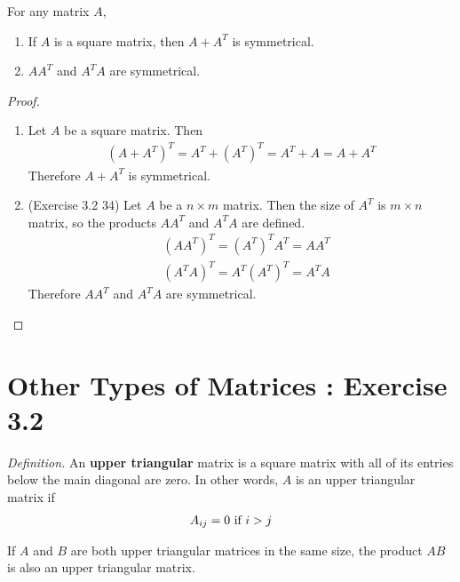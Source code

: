 \begin{theorem}
	For any matrix $A$,
	\begin{enumerate}
		\item If $A$ is a square matrix, then $A + A^{T}$ is symmetrical.
		\item $AA^{T}$ and $A^{T}A$ are symmetrical.
	\end{enumerate}
\end{theorem}

\begin{proof}
	\noindent
	\begin{enumerate}
		\item Let $A$ be a square matrix. Then
		\begin{align*}
		(A+A^T)^T = A^T + (A^T)^T = A^T + A = A+A^T
		\end{align*}
		Therefore $A+A^T$ is symmetrical.
		\item (Exercise 3.2 34) Let $A$ be a $n \times m$ matrix. Then the size of $A^T$ is $m \times n$ matrix, so the products $AA^T$ and $A^TA$ are defined.
		\begin{align*}
		& (AA^T)^T = (A^T)^TA^T = AA^T \\
		& (A^TA)^T = A^T(A^T)^T = A^TA
		\end{align*}
		Therefore $AA^T$ and $A^TA$ are symmetrical.
	\end{enumerate}
\end{proof}

\section{Other Types of Matrices : Exercise 3.2}
\textit{Definition.} An \textbf{upper triangular} matrix is a square matrix with all of its entries below the main diagonal are zero. In other words, $A$ is an upper triangular matrix if
\begin{align*}
A_{ij} = 0 \textnormal{ if } i > j
\end{align*}

\begin{plaintheorem}
	If $A$ and $B$ are both upper triangular matrices in the same size, the product $AB$ is also an upper triangular matrix.
\end{plaintheorem}

